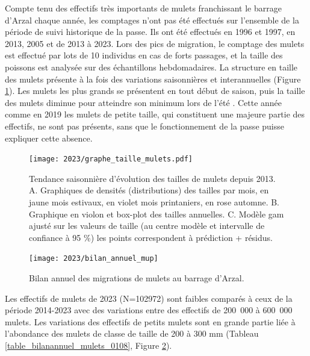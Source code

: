 \documentclass[11pt,twocolumn,titlepage,twoside]{article}\usepackage[]{graphicx}\usepackage[]{color}
\begin{document}
Compte tenu des effectifs très importants de mulets franchissant le barrage
d'Arzal chaque année, les comptages n'ont pas été effectués sur l'ensemble de la
période de suivi historique de la passe. Ils ont été effectués en 1996 et
1997, en 2013, 2005 et de 2013 à 2023. Lors des pics de migration, le comptage
des mulets est effectué par lots de 10 individus en cas de forts passages, et la taille des poissons est analysée
sur des échantillons hebdomadaires.
La structure en
taille des mulets présente à la fois des variations saisonnières et
interannuelles (Figure \ref{figure_taille_mulets}). Les mulets les plus grands
se présentent en tout début de saison, puis la taille des mulets diminue pour
atteindre son minimum lors de l'été \citep{lemonnier_dynamique_2019}.
Cette année comme en 2019 les mulets de petite taille, qui constituent une
majeure partie des effectifs, ne sont pas présents, sans que le fonctionnement
de la passe puisse expliquer cette absence.

\begin{figure}[htpb]
\centering
\texttt{[image: 2023/graphe\_taille\_mulets.pdf]} 
\caption{Tendance saisonnière d'évolution des
tailles de mulets depuis 2013. A. Graphiques de densités (distributions) des
tailles par mois, en jaune mois estivaux, en violet mois printaniers, en rose
automne. B. Graphique en violon et box-plot des tailles annuelles. C. Modèle gam
ajusté sur les valeurs de taille (au centre modèle et intervalle de confiance
 à 95 \%) les points correspondent à prédiction + résidus.}
\label{figure_taille_mulets}
\end{figure}



\begin{figure}[htpb]
\centering
\texttt{[image: 2023/bilan\_annuel\_mup]} 
\caption{Bilan annuel des migrations de mulets au barrage d'Arzal.}
\label{bilan_annuel_mup}
\end{figure}

Les effectifs de mulets de 2023
(N=102972) 
sont faibles comparés à ceux de la période 2014-2023 avec des variations entre
des effectifs de 200~000 à 600~000 mulets.
Les variations des effectifs de petits mulets sont en 
grande partie liée à l'abondance des mulets de classe de taille de 200 à 300 mm
\citep{lemonnier_dynamique_2019} (Tableau \ref{table_bilanannuel_mulets_0108}, Figure
\ref{bilan_annuel_mup}).
\end{document}
